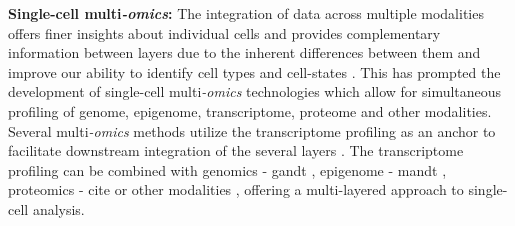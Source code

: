 \textbf{Single-cell multi\textit{-omics}: }The integration of data across multiple modalities offers finer insights about individual cells and provides complementary information between layers due to the inherent differences between them and improve our ability to identify cell types and cell-states \textbf{\cite{flynn_single-cell_2023}}. This has prompted the development of single-cell multi\textit{-omics} technologies which allow for simultaneous profiling of genome, epigenome, transcriptome, proteome and other modalities. Several multi\textit{-omics} methods utilize the transcriptome profiling as an anchor to facilitate downstream integration of the several layers \textbf{\cite{baysoy_technological_2023}}. The transcriptome profiling can be combined with genomics - \gls{gandt} \textbf{\cite{macaulay_gt-seq_2015}}, epigenome - \gls{mandt} \textbf{\cite{angermueller_parallel_2016}}, proteomics - \gls{cite} \textbf{\cite{stoeckius_simultaneous_2017}} or other modalities \textbf{\cite{dixit_perturb-seq_2016,singh_high-throughput_2019}}, offering a multi-layered approach to single-cell analysis.\\



